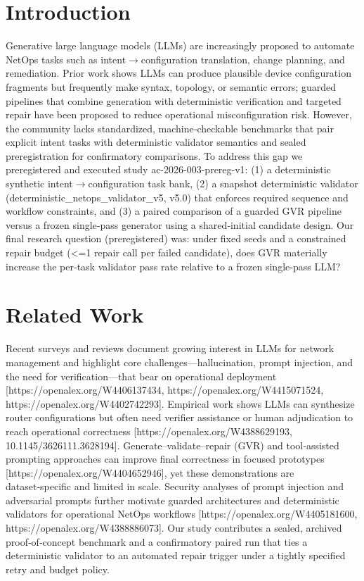 \documentclass[conference]{IEEEtran}
\begin{document}
\section{Introduction}
Generative large language models (LLMs) are increasingly proposed to automate NetOps tasks such as intent\ensuremath{\rightarrow}configuration translation, change planning, and remediation. Prior work shows LLMs can produce plausible device configuration fragments but frequently make syntax, topology, or semantic errors; guarded pipelines that combine generation with deterministic verification and targeted repair have been proposed to reduce operational misconfiguration risk. However, the community lacks standardized, machine‑checkable benchmarks that pair explicit intent tasks with deterministic validator semantics and sealed preregistration for confirmatory comparisons. To address this gap we preregistered and executed study ac-2026-003-prereg-v1: (1) a deterministic synthetic intent\ensuremath{\rightarrow}configuration task bank, (2) a snapshot deterministic validator (deterministic\_netops\_validator\_v5, v5.0) that enforces required sequence and workflow constraints, and (3) a paired comparison of a guarded GVR pipeline versus a frozen single‑pass generator using a shared‑initial candidate design. Our final research question (preregistered) was: under fixed seeds and a constrained repair budget (<=1 repair call per failed candidate), does GVR materially increase the per‑task validator pass rate relative to a frozen single‑pass LLM?

\section{Related Work}
Recent surveys and reviews document growing interest in LLMs for network management and highlight core challenges---hallucination, prompt injection, and the need for verification---that bear on operational deployment [https://openalex.org/W4406137434, https://openalex.org/W4415071524, https://openalex.org/W4402742293]. Empirical work shows LLMs can synthesize router configurations but often need verifier assistance or human adjudication to reach operational correctness [https://openalex.org/W4388629193, 10.1145/3626111.3628194]. Generate--validate--repair (GVR) and tool‑assisted prompting approaches can improve final correctness in focused prototypes [https://openalex.org/W4404652946], yet these demonstrations are dataset‑specific and limited in scale. Security analyses of prompt injection and adversarial prompts further motivate guarded architectures and deterministic validators for operational NetOps workflows [https://openalex.org/W4405181600, https://openalex.org/W4388886073]. Our study contributes a sealed, archived proof‑of‑concept benchmark and a confirmatory paired run that ties a deterministic validator to an automated repair trigger under a tightly specified retry and budget policy.
\end{document}
